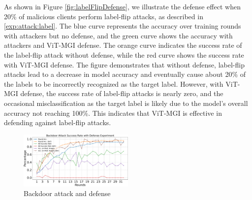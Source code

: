 \documentclass[conference]{IEEEtran}
\def\figBackdoorAttackDefense{0.5\textwidth}
\begin{document}
As shown in Figure \hyperref[fig:labelFlipDefense]{\ref{fig:labelFlipDefense}}, we illustrate the defense effect when 20\% of malicious clients perform label-flip attacks, as described in \hyperref[exp:attack:label]{\ref{exp:attack:label}}. The blue curve represents the accuracy over training rounds with attackers but no defense, and the green curve shows the accuracy with attackers and ViT-MGI defense. The orange curve indicates the success rate of the label-flip attack without defense, while the red curve shows the success rate with ViT-MGI defense. The figure demonstrates that without defense, label-flip attacks lead to a decrease in model accuracy and eventually cause about 20\% of the labels to be incorrectly recognized as the target label. However, with ViT-MGI defense, the success rate of label-flip attacks is nearly zero, and the occasional misclassification as the target label is likely due to the model's overall accuracy not reaching 100\%. This indicates that ViT-MGI is effective in defending against label-flip attacks.

\begin{figure}[htbp]
    \centerline{\includegraphics[width=\figBackdoorAttackDefense]{pics/006-backdoorAttack-WithDefense.pdf}}
    \vspace{-10px}  %
    \caption{Backdoor attack and defense\vspace{-8px}}
    \label{fig:backdoorAttackDefense}    
\end{figure}

\end{document}
